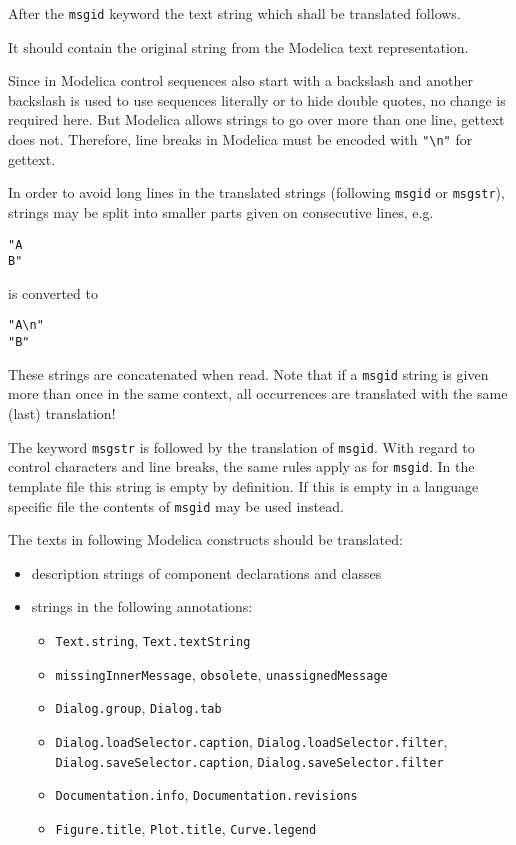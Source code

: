 \begin{nonnormative}
After the \lstinline!msgid! keyword the text string which shall be translated follows.
\end{nonnormative}
It should contain the original string from the Modelica text representation.
\begin{nonnormative}
Since in Modelica control sequences also start with a backslash and another backslash is used to use sequences literally or to hide double quotes, no change is required here.
But Modelica allows strings to go over more than one line, gettext does not.
Therefore, line breaks in Modelica must be encoded with \lstinline!"\n"! for gettext.

In order to avoid long lines in the translated strings (following \lstinline!msgid! or \lstinline!msgstr!), strings may be split into smaller parts given on consecutive lines, e.g.
\begin{lstlisting}
"A
B"
\end{lstlisting}
is converted to
\begin{lstlisting}
"A\n"
"B"
\end{lstlisting}
These strings are concatenated when read.
Note that if a \lstinline!msgid! string is given more than once in the same context, all occurrences are translated with the same (last) translation!

The keyword \lstinline!msgstr! is followed by the translation of \lstinline!msgid!.
With regard to control characters and line breaks, the same rules apply as for \lstinline!msgid!.
In the template file this string is empty by definition.
If this is empty in a language specific file the contents of \lstinline!msgid! may be used instead.
\end{nonnormative}

The texts in following Modelica constructs should be translated:
\begin{itemize}
\item description strings of component declarations and classes
\item strings in the following annotations:
\begin{itemize}
\item \lstinline!Text.string!, \lstinline!Text.textString!
\item \lstinline!missingInnerMessage!, \lstinline!obsolete!, \lstinline!unassignedMessage!
\item \lstinline!Dialog.group!, \lstinline!Dialog.tab!
\item \lstinline!Dialog.loadSelector.caption!, \lstinline!Dialog.loadSelector.filter!, \lstinline!Dialog.saveSelector.caption!, \lstinline!Dialog.saveSelector.filter!
\item \lstinline!Documentation.info!, \lstinline!Documentation.revisions!
\item \lstinline!Figure.title!, \lstinline!Plot.title!, \lstinline!Curve.legend!
\end{itemize}
\end{itemize}


